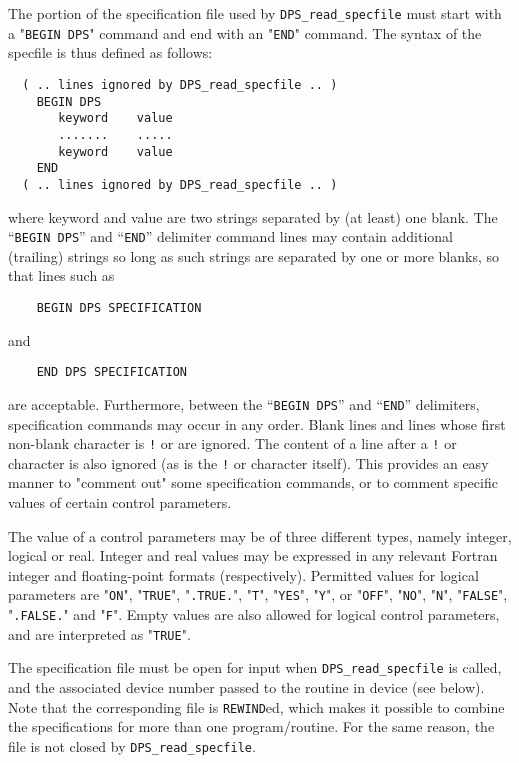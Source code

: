 \documentclass{galahad}
\newcommand{\packagename}{DPS}
\begin{document}
The portion of the specification file used by
{\tt \packagename\_read\_specfile}
must start
with a "{\tt BEGIN \packagename}" command and end with an
"{\tt END}" command.  The syntax of the specfile is thus defined as follows:
\begin{verbatim}
  ( .. lines ignored by DPS_read_specfile .. )
    BEGIN DPS
       keyword    value
       .......    .....
       keyword    value
    END
  ( .. lines ignored by DPS_read_specfile .. )
\end{verbatim}
where keyword and value are two strings separated by (at least) one blank.
The ``{\tt BEGIN \packagename}'' and ``{\tt END}'' delimiter command lines
may contain additional (trailing) strings so long as such strings are
separated by one or more blanks, so that lines such as
\begin{verbatim}
    BEGIN DPS SPECIFICATION
\end{verbatim}
and
\begin{verbatim}
    END DPS SPECIFICATION
\end{verbatim}
are acceptable. Furthermore,
between the
``{\tt BEGIN \packagename}'' and ``{\tt END}'' delimiters,
specification commands may occur in any order.  Blank lines and
lines whose first non-blank character is {\tt !} or {\tt *} are ignored.
The content
of a line after a {\tt !} or {\tt *} character is also
ignored (as is the {\tt !} or {\tt *}
character itself). This provides an easy manner to "comment out" some
specification commands, or to comment specific values
of certain control parameters.

The value of a control parameters may be of three different types, namely
integer, logical or real.
Integer and real values may be expressed in any relevant Fortran integer and
floating-point formats (respectively). Permitted values for logical
parameters are "{\tt ON}", "{\tt TRUE}", "{\tt .TRUE.}", "{\tt T}",
"{\tt YES}", "{\tt Y}", or "{\tt OFF}", "{\tt NO}",
"{\tt N}", "{\tt FALSE}", "{\tt .FALSE.}" and "{\tt F}".
Empty values are also allowed for
logical control parameters, and are interpreted as "{\tt TRUE}".

The specification file must be open for
input when {\tt \packagename\_read\_specfile}
is called, and the associated device number
passed to the routine in device (see below).
Note that the corresponding
file is {\tt REWIND}ed, which makes it possible to combine the specifications
for more than one program/routine.  For the same reason, the file is not
closed by {\tt \packagename\_read\_specfile}.
\end{document}
